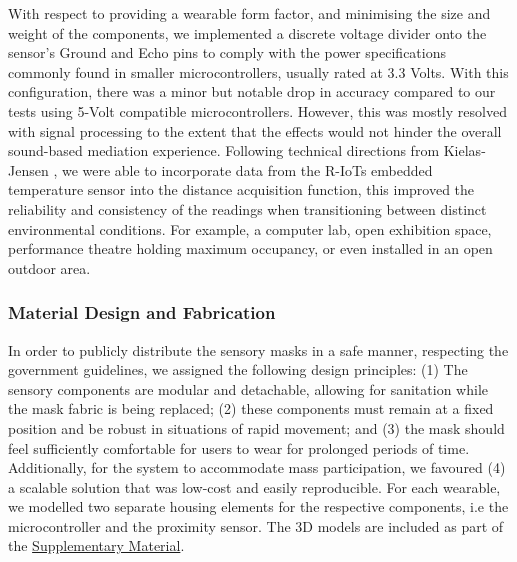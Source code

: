 With respect to providing a wearable form factor, and minimising the size and weight of the components, we implemented a discrete voltage divider onto the sensor’s Ground and Echo pins to comply with the power specifications commonly found in smaller microcontrollers, usually rated at 3.3 Volts. With this configuration, there was a minor but notable drop in accuracy compared to our tests using 5-Volt compatible microcontrollers. However, this was mostly resolved with signal processing to the extent that the effects would not hinder the overall sound-based mediation experience. Following technical directions from Kielas-Jensen \citep{magicbycalvin_improve_nodate}, we were able to incorporate data from the R-IoTs embedded temperature sensor into the distance acquisition function, this improved the reliability and consistency of the readings when transitioning between distinct environmental conditions. For example, a computer lab, open exhibition space, performance theatre holding maximum occupancy, or even installed in an open outdoor area.

\subsubsection{Material Design and Fabrication}
\label{subsec:fabrication}

In order to publicly distribute the sensory masks in a safe manner, respecting the government guidelines, we assigned the following design principles: (1) The sensory components are modular and detachable, allowing for sanitation while the mask fabric is being replaced; (2) these components must remain at a fixed position and be robust in situations of rapid movement; and (3) the mask should feel sufficiently comfortable for users to wear for prolonged periods of time. Additionally, for the system to accommodate mass participation, we favoured (4) a scalable solution that was low-cost and easily reproducible. For each wearable, we modelled two separate housing elements for the respective components, i.e the microcontroller and the proximity sensor. The 3D models are included as part of the \hyperref[SupplementaryMaterial]{Supplementary Material}.

